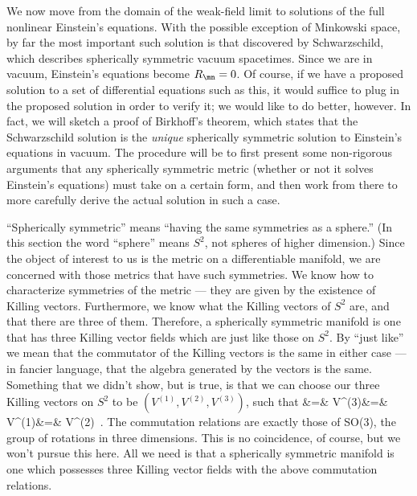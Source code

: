 \documentclass[12pt]{article}
\begin{document}
We now move from the domain of the weak-field limit to solutions of
the full nonlinear Einstein's equations.  With the possible exception
of Minkowski space, by far the most important such solution is that
discovered by Schwarzschild, which describes spherically symmetric
vacuum spacetimes.  Since we are in vacuum, Einstein's equations
become $R_\mn =0$.  Of course, if we have a proposed solution to
a set of differential equations such as this, it would suffice to
plug in the proposed solution in order to verify it; we would like
to do better, however.  In fact, we will sketch a proof of Birkhoff's
theorem, which states that the Schwarzschild solution is the {\it unique}
spherically symmetric solution to Einstein's equations in vacuum.
The procedure will be to first present some
non-rigorous arguments that any spherically symmetric metric (whether
or not it solves Einstein's equations) must take on a certain form,
and then work from there to more carefully derive the actual solution
in such a case.

``Spherically symmetric'' means ``having the same symmetries as a 
sphere.''  (In this section the word ``sphere'' means $S^2$, not
spheres of higher dimension.)
Since the object of interest to us is the metric on
a differentiable manifold, we are concerned with those metrics that
have such symmetries.  We know how to characterize symmetries of
the metric --- they are given by the existence of Killing vectors.
Furthermore, we know what the Killing vectors of $S^2$ are, and that 
there are three of them.  Therefore, a spherically symmetric manifold is 
one that has three Killing vector fields which are just like those
on $S^2$.  By ``just like'' we mean that the commutator of the
Killing vectors is the same in either case --- in fancier language,
that the algebra generated by the vectors is the same.  Something that
we didn't show, but is true, is that we can choose our three Killing
vectors on $S^2$ to be $(V^{(1)},V^{(2)},V^{(3)})$, such that
\bea
  [V^{(1)},V^{(2)}] &=&  V^{(3)}\cr
  [V^{(2)},V^{(3)}] &=&  V^{(1)}\cr [V^{(3)},V^{(1)}] &=&  V^{(2)}\ .
  \label{7.1}
\eea
The commutation relations are exactly those of SO(3), the group of 
rotations in three dimensions.  This is no coincidence, of course,
but we won't pursue this here.  All we need is that a spherically
symmetric manifold is one which possesses three Killing vector fields
with the above commutation relations.
\end{document}

